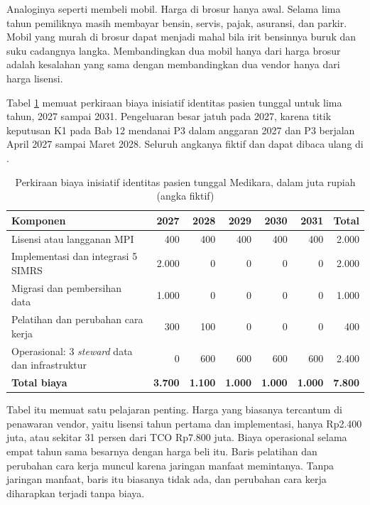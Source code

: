 Analoginya seperti membeli mobil. Harga di brosur hanya awal. Selama lima
tahun pemiliknya masih membayar bensin, servis, pajak, asuransi, dan parkir.
Mobil yang murah di brosur dapat menjadi mahal bila irit bensinnya buruk dan
suku cadangnya langka. Membandingkan dua mobil hanya dari harga brosur adalah
kesalahan yang sama dengan membandingkan dua vendor hanya dari harga lisensi.

Tabel \ref{tab:ch13-biaya-mpi} memuat perkiraan biaya inisiatif identitas
pasien tunggal untuk lima tahun, 2027 sampai 2031. Pengeluaran besar jatuh pada
2027, karena titik keputusan K1 pada Bab 12 mendanai P3 dalam anggaran 2027 dan
P3 berjalan April 2027 sampai Maret 2028. Seluruh angkanya fiktif dan dapat
dibaca ulang di .

\begin{table}[!htb]
  \centering
  \caption{Perkiraan biaya inisiatif identitas pasien tunggal Medikara, dalam
           juta rupiah (angka fiktif)}
  \label{tab:ch13-biaya-mpi}
  \footnotesize
  \begin{tabularx}{\textwidth}{>{\raggedright\arraybackslash}Xrrrrrr}
    \hline
    \textbf{Komponen} & \textbf{2027} & \textbf{2028} & \textbf{2029} &
      \textbf{2030} & \textbf{2031} & \textbf{Total} \\
    \hline
    Lisensi atau langganan MPI & 400 & 400 & 400 & 400 & 400 & 2.000 \\
    \hline
    Implementasi dan integrasi 5 SIMRS & 2.000 & 0 & 0 & 0 & 0 & 2.000 \\
    \hline
    Migrasi dan pembersihan data & 1.000 & 0 & 0 & 0 & 0 & 1.000 \\
    \hline
    Pelatihan dan perubahan cara kerja & 300 & 100 & 0 & 0 & 0 & 400 \\
    \hline
    Operasional: 3 \textit{steward} data dan infrastruktur & 0 & 600 & 600 &
      600 & 600 & 2.400 \\
    \hline
    \textbf{Total biaya} & \textbf{3.700} & \textbf{1.100} & \textbf{1.000} &
      \textbf{1.000} & \textbf{1.000} & \textbf{7.800} \\
    \hline
  \end{tabularx}
\end{table}

Tabel itu memuat satu pelajaran penting. Harga yang biasanya tercantum di
penawaran vendor, yaitu lisensi tahun pertama dan implementasi, hanya
Rp2.400 juta, atau sekitar 31 persen dari TCO Rp7.800 juta. Biaya operasional
selama empat tahun sama besarnya dengan harga beli itu. Baris pelatihan dan
perubahan cara kerja muncul karena jaringan manfaat memintanya. Tanpa
jaringan manfaat, baris itu biasanya tidak ada, dan perubahan cara kerja
diharapkan terjadi tanpa biaya.

